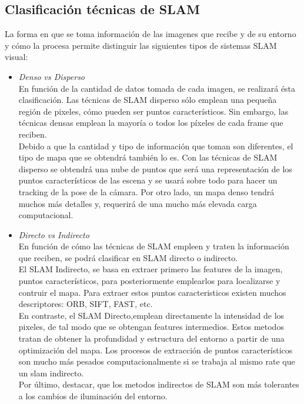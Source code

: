 \subsection{Clasificación técnicas de SLAM}
La forma en que se toma información de las imagenes que recibe y de su entorno y cómo la procesa permite distinguir las siguientes tipos de sistemas
SLAM visual:
\begin{itemize}
\item \textit{Denso vs Disperso} \\
En función de la cantidad de datos tomada de cada imagen, se realizará ésta clasificación. Las técnicas de SLAM disperso sólo emplean una pequeña
región de pixeles, cómo pueden ser puntos característicos. Sin embargo, las técnicas densas emplean la mayoría o todos los píxeles de cada frame
que reciben. \\
Debido a que la cantidad y tipo de información que toman son diferentes, el tipo de mapa que se obtendrá también lo es. Con las técnicas de SLAM
disperso se obtendrá una nube de puntos que será una representación de los puntos característicos de las escena y se usará sobre todo para hacer
un tracking de la pose de la cámara. Por otro lado, un mapa denso tendrá muchos más detalles y, requerirá de una mucho más elevada carga computacional.

 \item \textit{Directo vs Indirecto} \\
En función de cómo las técnicas de SLAM empleen y traten la información que reciben, se podrá clasificar en SLAM directo o indirecto.\\
El SLAM Indirecto, se basa en extraer primero las features de la imagen, puntos característicos, para posteriormente emplearlos para localizarse y contruir
el mapa. Para extraer estos puntos caracteristicos existen muchos descriptores: ORB, SIFT, FAST, etc. \\
En contraste, el SLAM Directo,emplean directamente la intensidad de los pixeles, de tal modo que se obtengan features intermedios. Estos metodos tratan de 
obtener la profundidad y estructura del entorno a partir de una optimización del mapa. Los procesos de extracción de puntos característicos son mucho más
pesados computacionalmente si se trabaja al mismo rate que un slam indirecto.\\
Por último, destacar, que los metodos indirectos de SLAM son más tolerantes a los cambios de iluminación del entorno.\\


\end{itemize}

